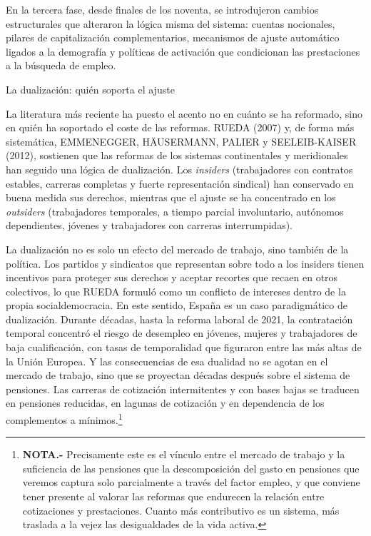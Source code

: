 \documentclass[10pt,a4paper]{article}
\begin{document}
En la tercera fase, desde finales de los noventa, se introdujeron cambios estructurales que alteraron la lógica misma del sistema: cuentas nocionales, pilares de capitalización complementarios, mecanismos de ajuste automático ligados a la demografía y políticas de activación que condicionan las prestaciones a la búsqueda de empleo.



La dualización: quién soporta el ajuste

La literatura más reciente ha puesto el acento no en cuánto se ha reformado, sino en quién ha soportado el coste de las reformas. RUEDA (2007) y, de forma más sistemática, EMMENEGGER, HÄUSERMANN, PALIER y SEELEIB-KAISER (2012), sostienen que las reformas de los sistemas continentales y meridionales han seguido una lógica de dualización. Los \textit{insiders} (trabajadores con contratos estables, carreras completas y fuerte representación sindical) han conservado en buena medida sus derechos, mientras que el ajuste se ha concentrado en los \textit{outsiders} (trabajadores temporales, a tiempo parcial involuntario, autónomos dependientes, jóvenes y trabajadores con carreras interrumpidas). 

La dualización no es solo un efecto del mercado de trabajo, sino también de la política. Los partidos y sindicatos que representan sobre todo a los insiders tienen incentivos para proteger sus derechos y aceptar recortes que recaen en otros colectivos, lo que RUEDA formuló como un conflicto de intereses dentro de la propia socialdemocracia. En este sentido, España es un caso paradigmático de dualización. Durante décadas, hasta la reforma laboral de 2021, la contratación temporal concentró el riesgo de desempleo en jóvenes, mujeres y trabajadores de baja cualificación, con tasas de temporalidad que figuraron entre las más altas de la Unión Europea. Y las consecuencias de esa dualidad no se agotan en el mercado de trabajo, sino que se proyectan décadas después sobre el sistema de pensiones. Las carreras de cotización intermitentes y con bases bajas se traducen en pensiones reducidas, en lagunas de cotización y en dependencia de los complementos a mínimos.\footnote{\textbf{NOTA.-} Precisamente este es el vínculo entre el mercado de trabajo y la suficiencia de las pensiones que la descomposición del gasto en pensiones que veremos captura solo parcialmente a través del factor empleo, y que conviene tener presente al valorar las reformas que endurecen la relación entre cotizaciones y prestaciones. Cuanto más contributivo es un sistema, más traslada a la vejez las desigualdades de la vida activa.
}
\end{document}
